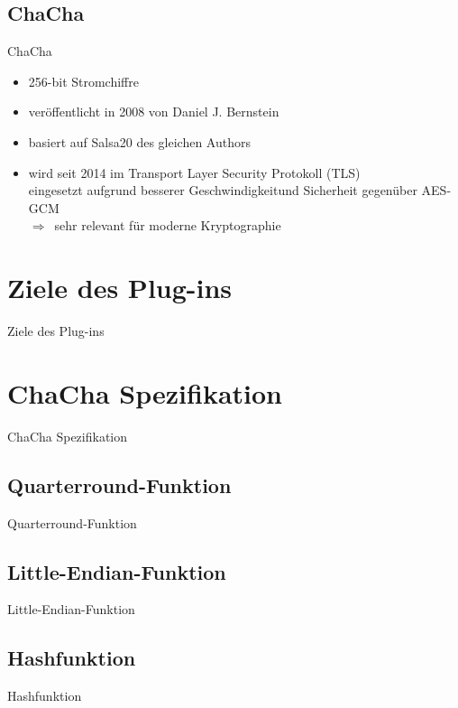 \documentclass{beamer}
\begin{document}
\subsection{ChaCha}
\begin{frame}{ChaCha}
\renewcommand*{\thefootnote}{\fnsymbol{footnote}}
\begin{itemize}
\item 256-bit Stromchiffre
\item veröffentlicht in 2008 von Daniel J. Bernstein
\item basiert auf Salsa20 des gleichen Authors
\item wird seit 2014 im Transport Layer Security Protokoll (TLS) \\eingesetzt aufgrund besserer Geschwindigkeit\footnotemark und Sicherheit gegenüber AES-GCM\\ $\Rightarrow$\ sehr relevant für moderne Kryptographie
\end{itemize}
\end{frame}

\section{Ziele des Plug-ins}
\begin{frame}{Ziele des Plug-ins}
\end{frame}

\section{ChaCha Spezifikation}
\begin{frame}{ChaCha Spezifikation}
\end{frame}

\subsection{Quarterround-Funktion}
\begin{frame}{Quarterround-Funktion}
\end{frame}

\subsection{Little-Endian-Funktion}
\begin{frame}{Little-Endian-Funktion}
\end{frame}

\subsection{Hashfunktion}
\begin{frame}{Hashfunktion}
\end{frame}
\end{document}
